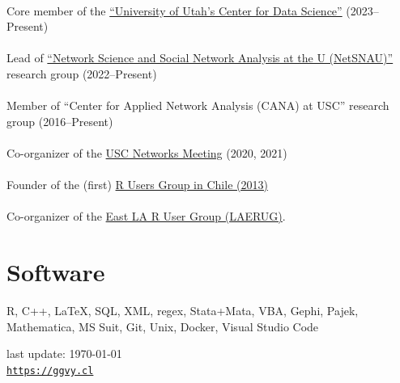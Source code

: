 \documentclass[letterpaper, 10pt]{article}
\def\footerlink{https://ggvy.cl}
\renewcommand{\textbf}[1]{{\bfseries\color{teal}#1}}
\begin{document}
\noindent \textbf{Misc}\\

\noindent Core member of the \href{https://datascience.utah.edu}{``University of Utah's Center for Data Science''} (2023--Present)\\\\
%
Lead of \href{https://netsci.utah.edu}{``Network Science and Social Network Analysis at the U (NetSNAU)''} research group (2022--Present)\\\\
%
Member of ``Center for Applied Network Analysis (CANA) at USC'' research group (2016--Present) \\\\
%
Co-organizer of the \href{https://networkanalysis.usc.edu}{USC Networks Meeting} (2020, 2021)\\\\
%
Founder of the (first) \href{https://www.meetup.com/useRchile/}{R Users Group in Chile (2013)}\\\\
%
Co-organizer of the \href{https://socalr.org}{East LA R User Group (LAERUG)}.

\section*{Software}

R, C++, \LaTeX, SQL, XML, regex, Stata+Mata, VBA, Gephi, Pajek, Mathematica, MS Suit, Git, Unix, Docker, Visual Studio Code

\bigskip

\begin{center}
 \begin{footnotesize}
   last update: \today \\
   \href{\footerlink}{\texttt{\footerlink}}
 \end{footnotesize}
\end{center}
\end{document}
